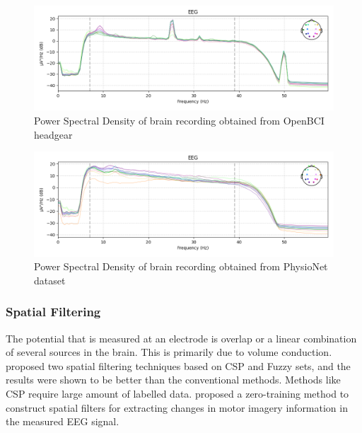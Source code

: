 \begin{figure}[H] 
   
    \includegraphics[width =1.0\textwidth]{images/obci_rawfltrd_psd.png}
    \caption{Power Spectral Density of brain recording obtained from OpenBCI headgear}
    \label{fig:obci_rawfltrd_psd}

\end{figure}

\begin{figure}[H] 
    \begin{center}
    \includegraphics[width =1.0\textwidth]{images/phy_rawfltrd_psd.png}
    \caption{Power Spectral Density of brain recording obtained from PhysioNet dataset}
    \label{fig:phy_rawfltrd_psd}
\end{center}
\end{figure}

\subsubsection{Spatial Filtering}
The potential that is measured at an electrode is overlap or a linear combination of several sources in the brain. This is primarily due to volume conduction. \cite{2017_EEG_SF} proposed two spatial filtering techniques based on CSP and Fuzzy sets, and the results were shown to be better than the conventional methods. Methods like CSP require large amount of labelled data. \cite{2012_SF_MI_ICA} proposed a zero-training method to construct spatial filters for extracting changes in motor imagery information in the measured EEG signal.

